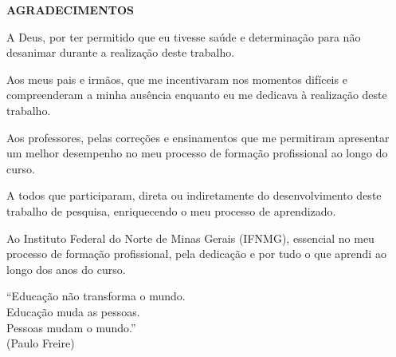 \documentclass[12pt,a4paper]{article}
\newcommand{\pretextualtitle}[1]{\begin{center}\textbf{\MakeUppercase{#1}}\end{center}\vspace{1em}}
\begin{document}
\pretextualtitle{AGRADECIMENTOS}
A Deus, por ter permitido que eu tivesse saúde e determinação para não desanimar durante a realização deste trabalho.

Aos meus pais e irmãos, que me incentivaram nos momentos difíceis e compreenderam a minha ausência enquanto eu me dedicava à realização deste trabalho.

Aos professores, pelas correções e ensinamentos que me permitiram apresentar um melhor desempenho no meu processo de formação profissional ao longo do curso.

A todos que participaram, direta ou indiretamente do desenvolvimento deste trabalho de pesquisa, enriquecendo o meu processo de aprendizado.

Ao Instituto Federal do Norte de Minas Gerais (IFNMG), essencial no meu processo de formação profissional, pela dedicação e por tudo o que aprendi ao longo dos anos do curso.

\clearpage

\thispagestyle{empty}
\vspace*{0.58\textheight}
\begin{flushright}
\begin{minipage}{0.52\textwidth}
\begin{flushright}
``Educação não transforma o mundo.\\
Educação muda as pessoas.\\
Pessoas mudam o mundo.''\\[0.8em]
(Paulo Freire)
\end{flushright}
\end{minipage}
\end{flushright}
\clearpage
\end{document}
